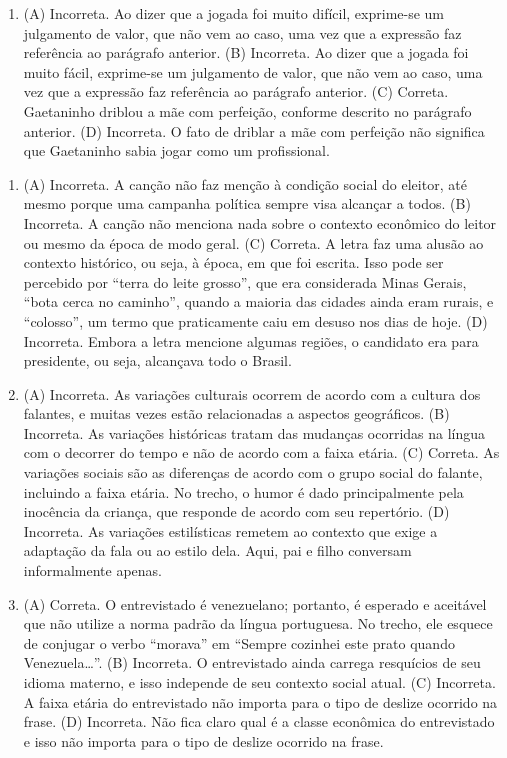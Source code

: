 
\begin{enumerate}
\item (A) Incorreta. Ao dizer que a jogada foi muito difícil, exprime-se um
julgamento de valor, que não vem ao caso, uma vez que a expressão faz
referência ao parágrafo anterior.
(B) Incorreta. Ao dizer que a jogada foi muito fácil, exprime-se um
julgamento de valor, que não vem ao caso, uma vez que a expressão faz
referência ao parágrafo anterior.
(C) Correta. Gaetaninho driblou a mãe com perfeição, conforme descrito
no parágrafo anterior.
(D) Incorreta. O fato de driblar a mãe com perfeição não significa que
Gaetaninho sabia jogar como um profissional.
\end{enumerate}


\begin{enumerate}
\item (A) Incorreta. A canção não faz menção à condição social do eleitor, até
mesmo porque uma campanha política sempre visa alcançar a todos.
(B) Incorreta. A canção não menciona nada sobre o contexto econômico do
leitor ou mesmo da época de modo geral.
(C) Correta. A letra faz uma alusão ao contexto histórico, ou seja, à
época, em que foi escrita. Isso pode ser percebido por ``terra do leite
grosso'', que era considerada Minas Gerais, ``bota cerca no caminho'',
quando a maioria das cidades ainda eram rurais, e ``colosso'', um termo
que praticamente caiu em desuso nos dias de hoje.
(D) Incorreta. Embora a letra mencione algumas regiões, o candidato era
para presidente, ou seja, alcançava todo o Brasil.

\item (A) Incorreta. As variações culturais ocorrem de acordo com a cultura dos
falantes, e muitas vezes estão relacionadas a aspectos geográficos.
(B) Incorreta. As variações históricas tratam das mudanças ocorridas na
língua com o decorrer do tempo e não de acordo com a faixa etária.
(C) Correta. As variações sociais são as diferenças de acordo com o grupo
social do falante, incluindo a faixa etária. No trecho, o humor é dado
principalmente pela inocência da criança, que responde de acordo com seu
repertório.
(D) Incorreta. As variações estilísticas remetem ao contexto que exige a
adaptação da fala ou ao estilo dela. Aqui, pai e filho conversam
informalmente apenas.

\item (A) Correta. O entrevistado é venezuelano; portanto, é esperado e
aceitável que não utilize a norma padrão da língua portuguesa. No
trecho, ele esquece de conjugar o verbo ``morava'' em ``Sempre cozinhei
este prato quando Venezuela\ldots{}''.
(B) Incorreta. O entrevistado ainda carrega resquícios de seu idioma
materno, e isso independe de seu contexto social atual.
(C) Incorreta. A faixa etária do entrevistado não importa para o tipo de
deslize ocorrido na frase.
(D) Incorreta. Não fica claro qual é a classe econômica do entrevistado e
isso não importa para o tipo de deslize ocorrido na frase.
\end{enumerate}

